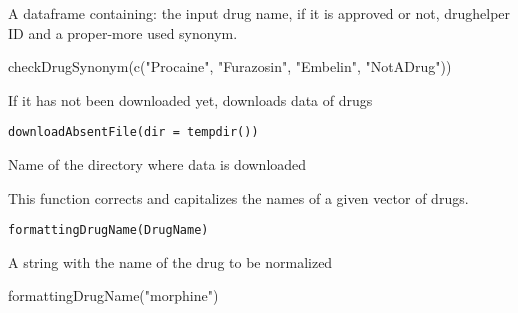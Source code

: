 \documentclass[a4paper]{book}
\begin{document}
%
\begin{Value}
A dataframe containing: the input drug name, if it is approved or not, drughelper ID and a proper-more used synonym.
\end{Value}
%
\begin{Examples}
\begin{ExampleCode}
checkDrugSynonym(c("Procaine", "Furazosin", "Embelin", "NotADrug"))
\end{ExampleCode}
\end{Examples}
%
\begin{Description}\relax
If it has not been downloaded yet, downloads data of drugs
\end{Description}
%
\begin{Usage}
\begin{verbatim}
downloadAbsentFile(dir = tempdir())
\end{verbatim}
\end{Usage}
%
\begin{Arguments}
\begin{ldescription}
\item[\code{dir}] Name of the directory where data is downloaded
\end{ldescription}
\end{Arguments}
%
\begin{Description}\relax
This function corrects and capitalizes the names of a given vector of drugs.
\end{Description}
%
\begin{Usage}
\begin{verbatim}
formattingDrugName(DrugName)
\end{verbatim}
\end{Usage}
%
\begin{Arguments}
\begin{ldescription}
\item[\code{DrugName}] A string with the name of the drug to be normalized
\end{ldescription}
\end{Arguments}
%
\begin{Examples}
\begin{ExampleCode}
formattingDrugName("morphine")
\end{ExampleCode}
\end{Examples}
\printindex{}
\end{document}
